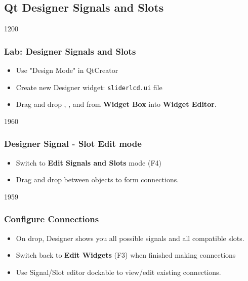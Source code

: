 %
%
%
%

\subsection{Qt Designer Signals and Slots}

\begin{slide}[fragile]{1200}
    \frametitle{Lab: Designer Signals and Slots}
\begin{itemize}
\item Use "Design Mode" in QtCreator
\item Create new Designer widget: \texttt{sliderlcd.ui} file
\item Drag and drop , , and  from \textbf{Widget Box} into \textbf{Widget Editor}.
\end{itemize}
\end{slide}

\begin{slide}[fragile]{1960}
    \frametitle{Designer Signal - Slot Edit mode}
\begin{itemize}
\item Switch to \textbf{Edit Signals and Slots} mode (F4)
\item Drag and drop between objects to form connections.
\end{itemize}

\end{slide}
\begin{slide}{1959}
\frametitle{Configure Connections}
\begin{itemize}
\item On drop, Designer shows you all possible signals and all compatible slots. 
\item Switch back to \textbf{Edit Widgets} (F3) when finished making connections
\item Use Signal/Slot editor dockable to view/edit existing connections.
\end{itemize}
\end{slide}

